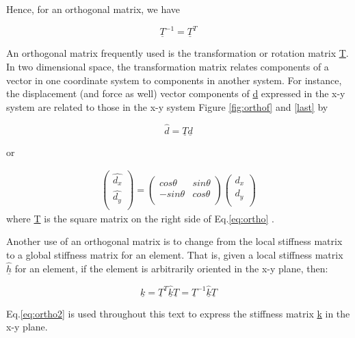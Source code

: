 \documentclass[12pt]{report}
\newcommand{\lab}[1]{
	Eq.\ref{#1}
}
\begin{document}
Hence, for an orthogonal matrix, we have

\begin{equation}
	\underline{T}^{-1}=\underline{T}^T
\end{equation}

An orthogonal matrix frequently used is the transformation or rotation
matrix \underline{T}. In two dimensional space, the transformation matrix
relates components of a vector in one coordinate system to components
in another system. For instance, the displacement (and force as well)
vector components of \underline{d} expressed in the x-y system are related to
those in the x-y system Figure \ref{fig:orthof} and \ref{last} by

\begin{equation}
	\hat{d}=\underline{T}\underline{d}
\end{equation}

or

\begin{eqnarray}
	\left(\begin{array}{rr}
	\hat{d_{x}} \\
	\hat{d_{y}} \\
\end{array}\right) = \left(\begin{array}{rr}
	cos\theta & sin\theta \\
	-sin\theta & cos\theta  \\
\end{array}\right)
	\left(\begin{array}{rr}
	d_{x} \\
	d_{y} \\
\end{array}\right)
	\label{eq:ortho}
\end{eqnarray}
where \underline{T} is the square matrix on the right side of \lab{eq:ortho}.


Another use of an orthogonal matrix is to change from the local
stiffness matrix to a global stiffness matrix for an element. That is,
given a local stiffness matrix $\hat{\underline{h}}$ for an element, if the
element is arbitrarily oriented in the x-y plane, then:

\begin{equation}
	\underline{k}=\underline{T}^T \hat{\underline{k}}\underline{T}=\underline{T}^{-1}\hat{\underline{k}}\underline{T}
	\label{eq:ortho2}
\end{equation}

\lab{eq:ortho2} is used throughout this text to express the
stiffness matrix \underline{k} in the x-y plane.
\end{document}
